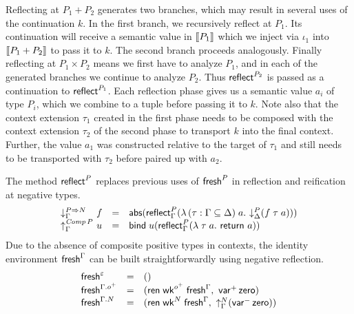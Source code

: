 \documentclass[sigplan,screen,fleqn]{acmart}
\begin{document}
Reflecting at $P_1 + P_2$ generates two branches, which may result in
several uses of the continuation $k$.
In the first branch, we recursively reflect at $P_1$.  Its
continuation will receive a semantic value in $\mathopen{{[\kern-0.14em[}} P_1 \mathclose{{]\kern-0.14em]}}$ which we
inject via $\iota_1$ into $\mathopen{{[\kern-0.14em[}} P_1 + P_2 \mathclose{{]\kern-0.14em]}}$ to pass it to $k$.  The
second branch proceeds analogously.
Finally reflecting at $P_1 \times P_2$ means we first have to analyze
$P_1$, and in each of the generated branches we continue to analyze
$P_2$.  Thus $\mathsf{reflect}_{}^{P_2}$ is passed as a continuation to
$\mathsf{reflect}_{}^{P_1}$.  Each reflection phase gives us a semantic value
$a_i$ of type $P_i$, which we combine to a tuple before passing it to
$k$.  Note also that the context extension $\tau_1$ created in the
first phase needs to be composed with the context extension $\tau_2$
of the second phase to transport $k$ into the final context.  Further,
the value $a_1$ was constructed relative to the target of
$\tau_1$ and still needs
to be transported with $\tau_2$ before paired up with $a_2$.

The method $\mathsf{reflect}_{}^{P}$ replaces previous uses of $\mathsf{fresh}^P$ in
reflection and reification at negative types.
\[
\begin{array}{l@{~}lcl}
  \downG {P \To N} & f & = & \tabs
    \left(
      \reflect[\Gamma] P
        \left(
          \lambda \, (\tau : \Gamma \sublist \Delta) \; a .\
          \down[\Delta] P (f \; \tau \; a)
        \right)
    \right)
  \\
  \upG {\Comp P} & u & = & \tbind \; u
    \left(
      \reflect[\Gamma] P
        \left(
          \lambda \; \tau \; a .\
          \treturn\; a
        \right)
    \right)
\end{array}
\]
Due to the absence of composite positive types in contexts,
the identity environment $\mathsf{fresh}^{\Gamma}$ can be built
straightforwardly using negative reflection.
\[
\begin{array}{lcl}
  \mathsf{fresh}^{\varepsilon} & = & () \\
  \mathsf{fresh}^{\Gamma.o^+} & = &
    (
      \mathsf{ren}\;\mathsf{wk}^{o^+}\;\mathsf{fresh}^{\Gamma}
      , \
      \mathsf{var}^{+}\,\mathsf{zero}
    ) \\
  \mathsf{fresh}^{\Gamma.N} & = &
    (
      \mathsf{ren}\;\mathsf{wk}^N\;\mathsf{fresh}^{\Gamma}
      , \
      \mathord{\uparrow_{\Gamma}^{N}} (\mathsf{var}^{-}\,\mathsf{zero})
    ) \\
\end{array}
\]
\end{document}
